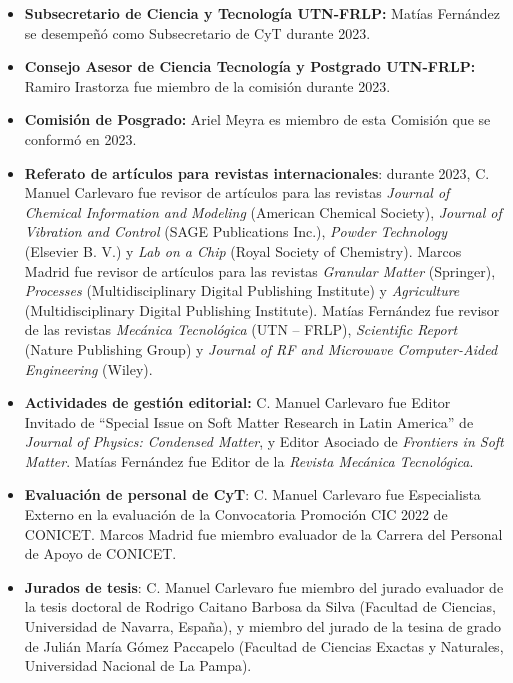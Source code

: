 \documentclass[a4paper,11pt,twoside,final,titlepage,onecolumn,openright]{report}
\begin{document}
\begin{itemize}
    \item \textbf{Subsecretario de Ciencia y Tecnología UTN-FRLP:} Matías Fernández se desempeñó como Subsecretario de CyT durante 2023.

  \item \textbf{Consejo Asesor de Ciencia Tecnología y Postgrado UTN-FRLP:} Ramiro Irastorza fue miembro de la comisión durante 2023. 

\item \textbf{Comisión de Posgrado:} Ariel Meyra es miembro de esta Comisión que se conformó en 2023.
  
\item \textbf{Referato de artículos para revistas internacionales}: durante 2023, C. Manuel Carlevaro fue revisor de artículos para las revistas \textit{Journal of Chemical Information and Modeling} (American Chemical Society), \textit{Journal of Vibration and Control} (SAGE Publications Inc.), \textit{Powder Technology} (Elsevier B. V.) y \textit{Lab on a Chip} (Royal Society of Chemistry). Marcos Madrid fue revisor de artículos para las revistas \textit{Granular Matter} (Springer), \textit{Processes} (Multidisciplinary Digital Publishing Institute) y \textit{Agriculture} (Multidisciplinary Digital Publishing Institute). Matías Fernández fue revisor de las revistas \textit{Mecánica Tecnológica} (UTN -- FRLP), \textit{Scientific Report} (Nature Publishing Group) y \textit{Journal of RF and Microwave Computer-Aided Engineering} (Wiley).
 
\item \textbf{Actividades de gestión editorial:} C. Manuel Carlevaro fue Editor Invitado de ``Special Issue on Soft Matter Research in Latin America'' de \textit{Journal of Physics: Condensed Matter}, y Editor Asociado de \textit{Frontiers in Soft Matter}. Matías Fernández fue Editor de la \textit{Revista Mecánica Tecnológica}.
 
     \item \textbf{Evaluación de personal de CyT}: C. Manuel Carlevaro fue Especialista Externo en la evaluación de la Convocatoria Promoción CIC 2022 de CONICET. Marcos Madrid fue miembro evaluador de la Carrera del Personal de Apoyo de CONICET.

\item \textbf{Jurados de tesis}: C. Manuel Carlevaro fue miembro del jurado evaluador de la tesis doctoral de Rodrigo Caitano Barbosa da Silva (Facultad de Ciencias, Universidad de Navarra, España), y miembro del jurado de la tesina de grado de Julián María Gómez Paccapelo (Facultad de Ciencias Exactas y Naturales, Universidad Nacional de La Pampa).


\end{itemize}
\end{document}
